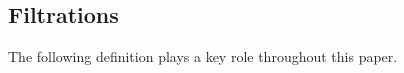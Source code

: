 \documentclass[10pt, a4paper,reqno]{amsart}
\newtheorem{lem}[lem]{Lemma}
\theoremstyle{definition}
\theoremstyle{remark}
\numberwithin{equation}{thm}
\def\fp{\mathfrak{p}}
\def\fq{\mathfrak{q}}
\def\sH{\mathsf{H}}
\def\dim{\operatorname{\mathsf{dim}}}
\def\depth{\operatorname{\mathsf{depth}}}
\def\Supp{\operatorname{\mathsf{Supp}}}
\def\Dfb{\mathsf{D^f_b}}
\def\Dfp{\mathsf{D^f_+}}
\def\ltensor{\otimes^{\mathbb{L}}}
\def\rHom{\mathbb{R}\mathsf{Hom}}
\def\hinf{\operatorname{\mathsf{hinf}}}
\begin{document}

\subsection{Filtrations}

The following definition plays a key role throughout this paper.
\end{document}
